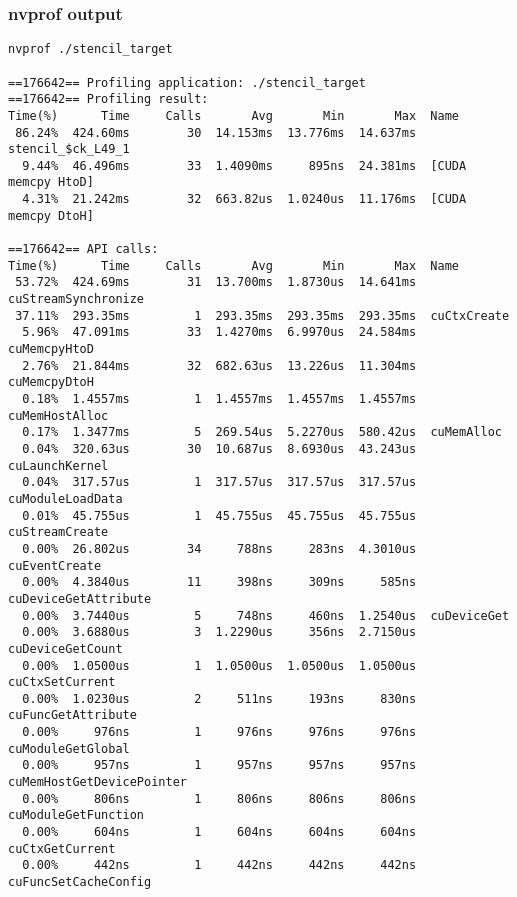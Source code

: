 \documentclass{beamer}
\begin{document}
\begin{frame}[fragile]
\frametitle{nvprof output}
\begin{verbatim}
nvprof ./stencil_target

==176642== Profiling application: ./stencil_target                                                                                                                                                                                          
==176642== Profiling result:                                                                                                                                                                                                                
Time(%)      Time     Calls       Avg       Min       Max  Name
 86.24%  424.60ms        30  14.153ms  13.776ms  14.637ms  stencil_$ck_L49_1
  9.44%  46.496ms        33  1.4090ms     895ns  24.381ms  [CUDA memcpy HtoD]
  4.31%  21.242ms        32  663.82us  1.0240us  11.176ms  [CUDA memcpy DtoH]
                                                                               
==176642== API calls:                                           
Time(%)      Time     Calls       Avg       Min       Max  Name
 53.72%  424.69ms        31  13.700ms  1.8730us  14.641ms  cuStreamSynchronize
 37.11%  293.35ms         1  293.35ms  293.35ms  293.35ms  cuCtxCreate
  5.96%  47.091ms        33  1.4270ms  6.9970us  24.584ms  cuMemcpyHtoD                 
  2.76%  21.844ms        32  682.63us  13.226us  11.304ms  cuMemcpyDtoH
  0.18%  1.4557ms         1  1.4557ms  1.4557ms  1.4557ms  cuMemHostAlloc
  0.17%  1.3477ms         5  269.54us  5.2270us  580.42us  cuMemAlloc
  0.04%  320.63us        30  10.687us  8.6930us  43.243us  cuLaunchKernel
  0.04%  317.57us         1  317.57us  317.57us  317.57us  cuModuleLoadData
  0.01%  45.755us         1  45.755us  45.755us  45.755us  cuStreamCreate
  0.00%  26.802us        34     788ns     283ns  4.3010us  cuEventCreate
  0.00%  4.3840us        11     398ns     309ns     585ns  cuDeviceGetAttribute
  0.00%  3.7440us         5     748ns     460ns  1.2540us  cuDeviceGet
  0.00%  3.6880us         3  1.2290us     356ns  2.7150us  cuDeviceGetCount
  0.00%  1.0500us         1  1.0500us  1.0500us  1.0500us  cuCtxSetCurrent
  0.00%  1.0230us         2     511ns     193ns     830ns  cuFuncGetAttribute
  0.00%     976ns         1     976ns     976ns     976ns  cuModuleGetGlobal
  0.00%     957ns         1     957ns     957ns     957ns  cuMemHostGetDevicePointer
  0.00%     806ns         1     806ns     806ns     806ns  cuModuleGetFunction
  0.00%     604ns         1     604ns     604ns     604ns  cuCtxGetCurrent
  0.00%     442ns         1     442ns     442ns     442ns  cuFuncSetCacheConfig

\end{verbatim}
\end{frame}
\end{document}
